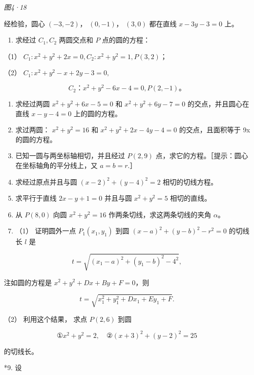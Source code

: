 \emph{图4·18}

经检验，圆心 \((-3,-2)\)， \((0,-1)\)， \((3,0)\) 都在直线 \(x-3y-3=0\)
上。

\begin{enumerate}
\def\labelenumi{\arabic{enumi}.}
\tightlist
\item
  求经过 \(C_{1}, C_{2}\) 两圆交点和 \(P\) 点的圆的方程：
\end{enumerate}

（1）
\(C_{1}: x^{2} + y^{2} + 2x = 0, C_{2}: x^{2} + y^{2} = 1, P(3, 2)\)；

（2） \(C_{1}: x^{2} + y^{2} - x + 2y - 3 = 0,\)

\[
C_{2}\text{：} x^{2} + y^{2} - 6 x - 4 = 0, P (2, - 1)\text{。}
\]

\begin{enumerate}
\def\labelenumi{\arabic{enumi}.}
\setcounter{enumi}{1}
\item
  求经过两圆 \(x^{2} + y^{2} + 6x - 5 = 0\) 和
  \(x^{2} + y^{2} + 6y - 7 = 0\) 的交点，并且圆心在直线
  \(x - y - 4 = 0\) 上的圆的方程。
\item
  求过两圆： \(x^{2}+y^{2}=16\) 和 \(x^{2}+y^{2}+2x-4y-4=0\)
  的交点，且面积等于 9x 的圆的方程。
\item
  已知一圆与两坐标轴相切，并且经过 \(P(2,9)\)
  点，求它的方程。［提示：圆心在坐标轴角的平分线上，又 \(a = b = r\).］
\item
  求经过原点并且与圆 \((x-2)^{2}+(y-4)^{2}=2\) 相切的切线方程。
\item
  求平行于直线 \(2x - y + 1 = 0\) 并且与圆 \(x^{2} + y^{2} = 5\)
  相切的直线。
\item
  从 \(P(8,0)\) 向圆 \(x^{2} + y^{2} = 16\)
  作两条切线，求这两条切线的夹角 \(\alpha\)。
\item
  （1） 证明圆外一点 \(P_{1}(x_{1}, y_{1})\) 到圆
  \((x - a)^{2} + (y - b)^{2} - r^{2} = 0\) 的切线长 \(l\) 是
\end{enumerate}

\[
t = \sqrt {(x_{1} - a) ^ {2} + (y_{1} - b) ^ {2} - 4^{2}},
\]

注如圆的方程是 \(x^{2} + y^{2} + Dx + By + F = 0\)，则

\[
t = \sqrt {x_{1} ^ {2} + y_{1} ^ {2} + D x_{1} + E y_{1} + F}.
\]

（2） 利用这个结果， 求点 \(P(2,6)\) 到圆

\[
① x^{2} + y^{2} = 2, \quad ② (x + 3) ^ {2} + (y - 2) ^ {2} = 25
\]

的切线长。

*9. 设

